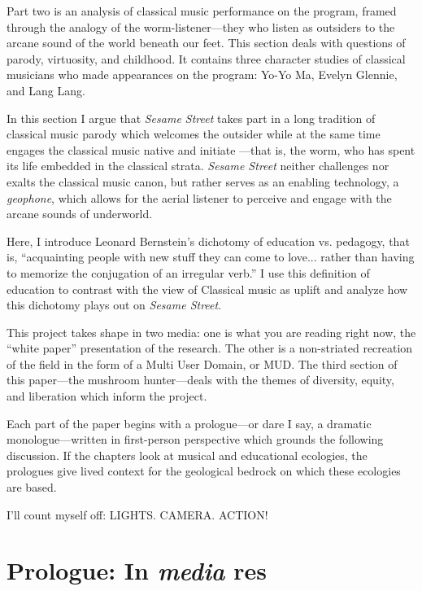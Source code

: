 \documentclass[12pt,letterpaper]{article}
\begin{document}
	Part two is an analysis of classical music performance on the program, 
	framed through the analogy of the worm-listener---they who listen as 
	outsiders to 
	the arcane sound of the world beneath our feet. This section deals with
	questions of parody, virtuosity, and childhood. It contains three
	character studies of classical musicians who made appearances on the
	program: Yo-Yo Ma, Evelyn Glennie, and Lang Lang.   

	
	In this section I argue that \textit{Sesame Street} takes part in a
	long tradition of classical music parody which welcomes the outsider
	while at the same time engages the classical music native and initiate
	---that is, the worm, who has spent its life embedded in the classical
	strata.
	\textit{Sesame Street} neither challenges nor exalts the classical 
	music canon, but rather serves as an enabling technology, a 
	\textit{geophone}, which allows for the aerial listener to perceive and
	engage with the arcane sounds of underworld.  
	
	Here, I introduce Leonard Bernstein's dichotomy of education vs.
	pedagogy, that is, ``acquainting people with 
	new stuff they can come to love... rather than having to memorize the 
	conjugation of an irregular verb.''\autocite[71]{Kopfstein} I use this
	definition of education to contrast with the view of Classical music as 
	uplift and analyze how this dichotomy plays out on \textit{Sesame
	Street}.  

	This project takes shape in two media: one is what you are reading 
	right now, the 
	``white paper'' presentation of the research. The other is a 
	non-striated recreation of the field in the form of a Multi User 
	Domain, or MUD. The third section of this paper---the mushroom 
	hunter---deals with the themes of diversity,
	equity, and liberation which inform the project.  
	
	Each part of the paper begins with a prologue---or dare I say, a 
	dramatic monologue---written in first-person perspective
	which grounds the following discussion. If the chapters look at
	musical and educational ecologies, the prologues give lived context for
	the geological bedrock on which these ecologies are based.  

	I'll count myself off: LIGHTS. CAMERA. ACTION!	

	\newpage	
	\section*{Prologue: In \textit{media} res}
	
\end{document}
